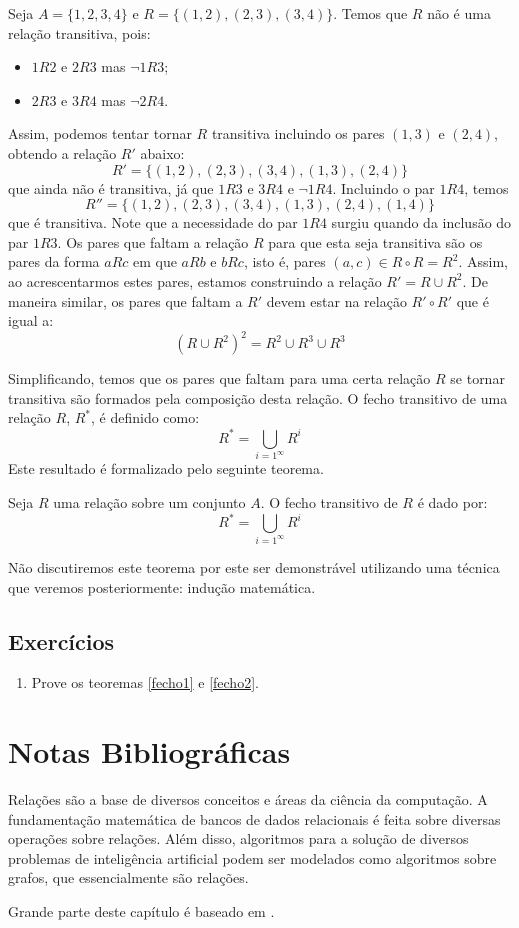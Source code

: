 \begin{Example}
Seja $A = \{1,2,3,4\}$ e $R =\{(1,2),(2,3),(3,4)\}$. Temos que $R$ não
é uma relação transitiva, pois:
\begin{itemize}
  \item $1R2$ e $2R3$ mas $\neg 1R3$;
  \item $2R3$ e $3R4$ mas $\neg 2R4$.
\end{itemize}
Assim, podemos tentar tornar $R$ transitiva incluindo os pares $(1,3)$
e $(2,4)$, obtendo a relação $R'$ abaixo:
\[
R' = \{(1,2),(2,3),(3,4),(1,3),(2,4)\}
\]
que ainda não é transitiva, já que $1R3$ e $3R4$ e $\neg
1R4$. Incluindo o par $1R4$, temos
\[
R'' = \{(1,2),(2,3),(3,4),(1,3),(2,4),(1,4)\}
\]
que é transitiva.
Note
que a necessidade do par $1R4$ surgiu quando da inclusão do par
$1R3$. Os pares que faltam a relação $R$ para que esta seja transitiva
são os pares  da forma $aRc$ em que $aRb$ e $bRc$, isto é, pares
$(a,c)\in R \circ R = R^2$. Assim, ao acrescentarmos estes pares,
estamos construindo a relação $R'= R \cup R^2$. De maneira similar, os
pares que faltam a $R'$ devem estar na relação $R' \circ R'$ que é
igual a:
\[
(R\cup R^2)^2 = R^2 \cup R^3 \cup R^3
\]
\end{Example}
Simplificando, temos que os pares que faltam para uma certa relação
$R$ se tornar transitiva são formados pela composição desta
relação. O fecho transitivo de uma relação $R$, $R^*$, é definido
como:
\[
R^* = \bigcup_{i = 1^\infty}R^i
\]
Este resultado é formalizado pelo seguinte teorema.
\begin{Theorem}
Seja $R$ uma relação sobre um conjunto $A$. O fecho transitivo de $R$
é dado por:
\[
R^* = \bigcup_{i = 1^\infty}R^i
\]
\end{Theorem}

Não discutiremos este teorema por este ser demonstrável utilizando uma
técnica que veremos posteriormente: indução matemática.

\subsection{Exercícios}

\begin{enumerate}
  \item Prove os teoremas \ref{fecho1} e \ref{fecho2}.
\end{enumerate}


\section{Notas Bibliográficas}

Relações são a base de diversos conceitos e áreas da ciência da
computação. A fundamentação matemática de bancos de dados relacionais
é feita sobre diversas operações sobre relações. Além disso,
algoritmos para a solução de diversos problemas de inteligência
artificial podem ser modelados como algoritmos sobre grafos, que
essencialmente são relações.

Grande parte deste capítulo é baseado em \cite{Velleman06}.